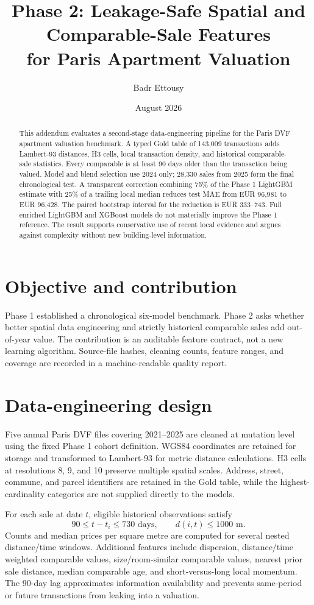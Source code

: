 \documentclass[11pt,a4paper]{article}
\title{Phase 2: Leakage-Safe Spatial and Comparable-Sale Features\\
for Paris Apartment Valuation}
\author{Badr Ettousy}
\date{August 2026}
\begin{document}
\maketitle

\begin{abstract}
This addendum evaluates a second-stage data-engineering pipeline for the Paris
DVF apartment valuation benchmark. A typed Gold table of 143,009 transactions
adds Lambert-93 distances, H3 cells, local transaction density, and historical
comparable-sale statistics. Every comparable is at least 90 days older than the
transaction being valued. Model and blend selection use 2024 only; 28,330 sales
from 2025 form the final chronological test. A transparent correction combining
75\% of the Phase 1 LightGBM estimate with 25\% of a trailing local median
reduces test MAE from EUR 96,981 to EUR 96,428. The paired bootstrap interval
for the reduction is EUR 333--743. Full enriched LightGBM and XGBoost models do
not materially improve the Phase 1 reference. The result supports conservative
use of recent local evidence and argues against complexity without new
building-level information.
\end{abstract}

\section{Objective and contribution}
Phase 1 established a chronological six-model benchmark. Phase 2 asks whether
better spatial data engineering and strictly historical comparable sales add
out-of-year value. The contribution is an auditable feature contract, not a new
learning algorithm. Source-file hashes, cleaning counts, feature ranges, and
coverage are recorded in a machine-readable quality report.

\section{Data-engineering design}
Five annual Paris DVF files covering 2021--2025 are cleaned at mutation level
using the fixed Phase 1 cohort definition. WGS84 coordinates are retained for
storage and transformed to Lambert-93 for metric distance calculations. H3
cells at resolutions 8, 9, and 10 preserve multiple spatial scales. Address,
street, commune, and parcel identifiers are retained in the Gold table, while
the highest-cardinality categories are not supplied directly to the models.

For each sale at date $t$, eligible historical observations satisfy
\[
  90 \leq t-t_i \leq 730 \text{ days}, \qquad d(i,t) \leq 1000 \text{ m}.
\]
Counts and median prices per square metre are computed for several nested
distance/time windows. Additional features include dispersion, distance/time
weighted comparable values, size/room-similar comparable values, nearest prior
sale distance, median comparable age, and short-versus-long local momentum.
The 90-day lag approximates information availability and prevents same-period
or future transactions from leaking into a valuation.
\end{document}
